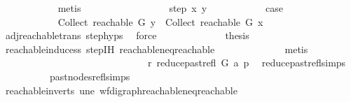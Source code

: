 \begin{isabellebody}
\ \ \ \ \ \ \ \ \ \ \isamarkupfalse%
\ {\isacharparenleft}{\kern0pt}metis{\isacharparenright}{\kern0pt}\ \isanewline
\ \ \ \ \ \ \isamarkupfalse%
\isanewline
\ \ \ \ \ \ \ \ \isamarkupfalse%
\ {\isacharparenleft}{\kern0pt}step\ x\ y{\isacharparenright}{\kern0pt}\isanewline
\ \ \ \ \ \ \ \ \isamarkupfalse%
\ \isamarkupfalse%
\ {\isacharquery}{\kern0pt}case\isanewline
\ \ \ \ \ \ \ \ \isamarkupfalse%
\ {\isacharminus}{\kern0pt}\isanewline
\ \ \ \ \ \ \ \ \ \ \isamarkupfalse%
\ {\isachardoublequoteopen}Collect\ {\isacharparenleft}{\kern0pt}reachable\ G\ y{\isacharparenright}{\kern0pt}\ {\isasymsubseteq}\ Collect\ {\isacharparenleft}{\kern0pt}reachable\ G\ x{\isacharparenright}{\kern0pt}{\isachardoublequoteclose}\isanewline
\ \ \ \ \ \ \ \ \ \ \ \ \isamarkupfalse%
\ adj{\isacharunderscore}{\kern0pt}reachable{\isacharunderscore}{\kern0pt}trans\ step{\isachardot}{\kern0pt}hyps{\isacharparenleft}{\kern0pt}{}{\isacharparenright}{\kern0pt}\ \isamarkupfalse%
\ force\isanewline
\ \ \ \ \ \ \ \ \ \ \isamarkupfalse%
\ \isamarkupfalse%
\ {\isacharquery}{\kern0pt}thesis\isanewline
\ \ \ \ \ \ \ \ \ \ \ \ \isamarkupfalse%
\ reachable{\isacharunderscore}{\kern0pt}induce{\isacharunderscore}{\kern0pt}ss\ step{\isachardot}{\kern0pt}IH\ reachable{\isacharunderscore}{\kern0pt}neq{\isacharunderscore}{\kern0pt}reachable{}\isanewline
\ \ \ \ \ \ \ \ \ \ \ \ \isamarkupfalse%
\ metis\ \isanewline
\ \ \ \ \ \ \ \ \isamarkupfalse%
\ \isanewline
\ \ \ \ \ \ \isamarkupfalse%
\ \ \ \isanewline
\ \ \ \ \ \ \isamarkupfalse%
\ \isamarkupfalse%
\ {\isachardoublequoteopen}r\ {\isasymrightarrow}\isactrlsup {\isacharplus}{\kern0pt}\isactrlbsub reduce{\isacharunderscore}{\kern0pt}past{\isacharunderscore}{\kern0pt}refl\ G\ a\isactrlesub \ p{\isachardoublequoteclose}\ \isamarkupfalse%
\ reduce{\isacharunderscore}{\kern0pt}past{\isacharunderscore}{\kern0pt}refl{\isachardot}{\kern0pt}simps\isanewline
\ \ \ \ \ \ \ \ \ \ past{\isacharunderscore}{\kern0pt}nodes{\isacharunderscore}{\kern0pt}refl{\isachardot}{\kern0pt}simps\ \isamarkupfalse%
\ reachable{\isacharunderscore}{\kern0pt}in{\isacharunderscore}{\kern0pt}verts\ une\ wf{\isacharunderscore}{\kern0pt}digraph{\isachardot}{\kern0pt}reachable{\isacharunderscore}{\kern0pt}neq{\isacharunderscore}{\kern0pt}reachable{}\isanewline

\end{isabellebody}

